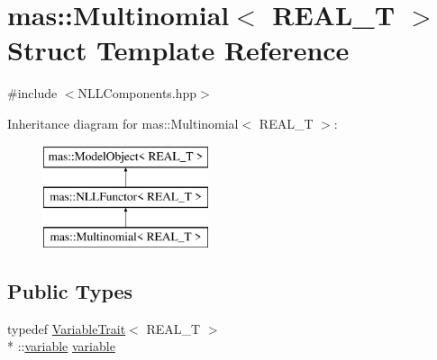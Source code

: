 \hypertarget{structmas_1_1_multinomial}{\section{mas\-:\-:Multinomial$<$ R\-E\-A\-L\-\_\-\-T $>$ Struct Template Reference}
\label{structmas_1_1_multinomial}
}


{\ttfamily \#include $<$N\-L\-L\-Components.\-hpp$>$}

Inheritance diagram for mas\-:\-:Multinomial$<$ R\-E\-A\-L\-\_\-\-T $>$\-:\begin{figure}[H]
\begin{center}
\leavevmode
\includegraphics[height=3.000000cm]{structmas_1_1_multinomial}
\end{center}
\end{figure}
\subsection*{Public Types}
\begin{DoxyCompactItemize}
\item 
typedef \hyperlink{structmas_1_1_variable_trait}{Variable\-Trait}$<$ R\-E\-A\-L\-\_\-\-T $>$\\*
\-::\hyperlink{structmas_1_1_model_object_a4e62fdbb5826f8fac311262b888ab10a}{variable} \hyperlink{structmas_1_1_multinomial_a3d7e943ca6b28c275046a26559ce8efe}{variable}
\end{DoxyCompactItemize}
